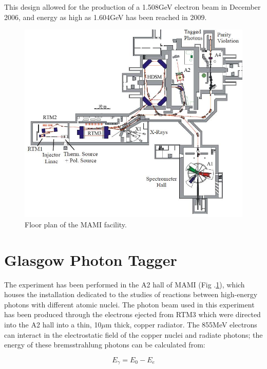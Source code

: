 This design allowed for the production of a 1.508GeV electron beam in December 2006, and energy as high as 1.604GeV has been reached in 2009.

\begin{figure}[H]
\begin{center}
\includegraphics[scale=0.5]{pictures/jpg/mamifloor.jpg}
\caption{Floor plan of the MAMI facility.}
\label{mamifloor}
\end{center}
\end{figure}

\section{Glasgow Photon Tagger}

\indent The experiment has been performed in the A2 hall of MAMI (Fig .\ref{mamifloor}), which houses the installation dedicated to the studies of reactions between high-energy photons with different atomic nuclei. The photon beam used in this experiment has been produced through the electrons ejected from RTM3 which were directed into the A2 hall into a thin, 10$\mu$m thick, copper radiator. The 855MeV electrons can interact in the electrostatic field of the copper nuclei and radiate photons; the energy of these bremsstrahlung photons can be calculated from:

\begin{equation}
E_{\gamma}=E_{0}-E_{e}
\end{equation}

